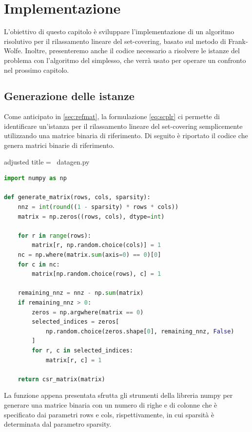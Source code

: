 \chapter{Implementazione}
L'obiettivo di questo capitolo è sviluppare l'implementazione di un algoritmo risolutivo per il rilassamento lineare del
set-covering, basato sul metodo di Frank-Wolfe.
Inoltre, presenteremo anche il codice
necessario a risolvere le istanze del problema con l'algoritmo del simplesso, che verrà usato per operare un confronto
nel prossimo capitolo.

\section{Generazione delle istanze}
Come anticipato in \ref{sec:refmat}, la formulazione \eqref{eq:scplr} ci permette di identificare un'istanza per il
rilassamento lineare del set-covering semplicemente utilizzando una matrice binaria di riferimento. Di seguito è
riportato il codice che genera matrici binarie di riferimento.

\begin{code}{adjusted title = {\pyicon\ datagen.py}}
\begin{lstlisting}[language=python, style = style, caption={Generazione delle matrici binarie di riferimento.}, label =
{lst:genmat}]
import numpy as np

def generate_matrix(rows, cols, sparsity):
    nnz = int(round((1 - sparsity) * rows * cols))
    matrix = np.zeros((rows, cols), dtype=int)

    for r in range(rows):
        matrix[r, np.random.choice(cols)] = 1
    nc = np.where(matrix.sum(axis=0) == 0)[0]
    for c in nc:
        matrix[np.random.choice(rows), c] = 1

    remaining_nnz = nnz - np.sum(matrix)
    if remaining_nnz > 0:
        zeros = np.argwhere(matrix == 0)
        selected_indices = zeros[
            np.random.choice(zeros.shape[0], remaining_nnz, False)
        ]
        for r, c in selected_indices:
            matrix[r, c] = 1

    return csr_matrix(matrix)
\end{lstlisting}
\end{code}
\noindent
La funzione appena presentata sfrutta gli strumenti della libreria numpy per generare una matrice binaria con un numero
di righe e di colonne che è specificato dai parametri {\jbm rows} e {\jbm cols}, rispettivamente, in cui sparsità è
determinata dal parametro {\jbm sparsity}.

